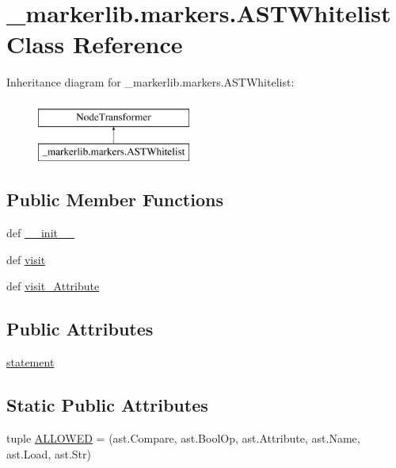 \hypertarget{class__markerlib_1_1markers_1_1ASTWhitelist}{}\section{\+\_\+markerlib.\+markers.\+A\+S\+T\+Whitelist Class Reference}
\label{class__markerlib_1_1markers_1_1ASTWhitelist}
Inheritance diagram for \+\_\+markerlib.\+markers.\+A\+S\+T\+Whitelist\+:\begin{figure}[H]
\begin{center}
\leavevmode
\includegraphics[height=2.000000cm]{class__markerlib_1_1markers_1_1ASTWhitelist}
\end{center}
\end{figure}
\subsection*{Public Member Functions}
\begin{DoxyCompactItemize}
\item 
def \hyperlink{class__markerlib_1_1markers_1_1ASTWhitelist_a69d82954801c76c7b74c4756442ea6b4}{\+\_\+\+\_\+init\+\_\+\+\_\+}
\item 
def \hyperlink{class__markerlib_1_1markers_1_1ASTWhitelist_a3a864c1bffbb92ace7b7639989cf035b}{visit}
\item 
def \hyperlink{class__markerlib_1_1markers_1_1ASTWhitelist_aebf8aa0d555f8fd9699c8beea2b381e0}{visit\+\_\+\+Attribute}
\end{DoxyCompactItemize}
\subsection*{Public Attributes}
\begin{DoxyCompactItemize}
\item 
\hyperlink{class__markerlib_1_1markers_1_1ASTWhitelist_a1749861260aad1bdb571afbf9372c2e8}{statement}
\end{DoxyCompactItemize}
\subsection*{Static Public Attributes}
\begin{DoxyCompactItemize}
\item 
tuple \hyperlink{class__markerlib_1_1markers_1_1ASTWhitelist_a71f5b73e908a2e1b1c0f921f32d82b21}{A\+L\+L\+O\+W\+E\+D} = (ast.\+Compare, ast.\+Bool\+Op, ast.\+Attribute, ast.\+Name, ast.\+Load, ast.\+Str)
\end{DoxyCompactItemize}


